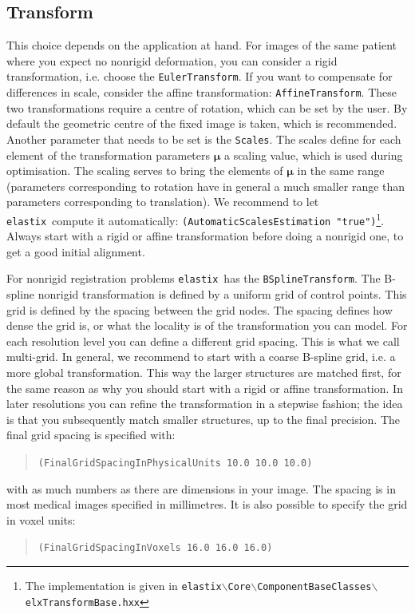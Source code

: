 \documentclass[]{report}
\newcommand{\elastix}{\texttt{elastix}}
\newcommand{\vmu}{\bm{\mu}}
\begin{document}
\subsection{Transform}\label{sec:transformtuning}

This choice depends on the application at hand. For images of the
same patient where you expect no nonrigid deformation, you can
consider a rigid transformation, i.e. choose the
\texttt{EulerTransform}. If you want to compensate for differences
in scale, consider the affine transformation:
\texttt{AffineTransform}. These two transformations require a centre
of rotation, which can be set by the user. By default the geometric
centre of the fixed image is taken, which is recommended. Another
parameter that needs to be set is the \texttt{Scales}. The scales
define for each element of the transformation parameters $\vmu$ a
scaling value, which is used during optimisation. The scaling serves
to bring the elements of $\vmu$ in the same range (parameters
corresponding to rotation have in general a much smaller range than
parameters corresponding to translation). We recommend to let
\elastix\ compute it automatically:
\texttt{(AutomaticScalesEstimation "true")}\footnote{The
implementation is given in
\texttt{elastix$\backslash$Core$\backslash$ComponentBaseClasses$\backslash$elxTransformBase.hxx}}.
Always start with a rigid or affine transformation before doing a
nonrigid one, to get a good initial alignment.

For nonrigid registration problems \elastix\ has the
\texttt{BSplineTransform}. The B-spline nonrigid transformation is
defined by a uniform grid of control points. This grid is defined
by the spacing between the grid nodes. The spacing defines how
dense the grid is, or what the locality is of the transformation
you can model. For each resolution level you can define a
different grid spacing. This is what we call multi-grid. In
general, we recommend to start with a coarse B-spline grid, i.e. a
more global transformation. This way the larger structures are
matched first, for the same reason as why you should start with a
rigid or affine transformation. In later resolutions you can
refine the transformation in a stepwise fashion; the idea is that
you subsequently match smaller structures, up to the final
precision. The final grid spacing is specified with:
\begin{quote}
\texttt{(FinalGridSpacingInPhysicalUnits 10.0 10.0 10.0)}
\end{quote}
with as much numbers as there are dimensions in your image. The
spacing is in most medical images specified in millimetres. It is
also possible to specify the grid in voxel units:
\begin{quote}
\texttt{(FinalGridSpacingInVoxels 16.0 16.0 16.0)}
\end{quote}
\end{document}
